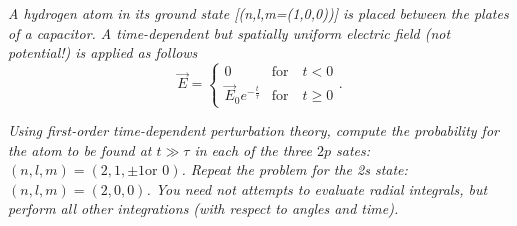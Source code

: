 \begin{example}
	\emph{A hydrogen atom in its ground state [(n,l,m=(1,0,0))] is placed between the plates of a capacitor. A time-dependent but spatially uniform electric field (not potential!) is applied as follows}
	\begin{equation}
		\vec{E}=\begin{cases} 0 &\mbox{for} \quad t<0 \\ 
			\vec{E}_0e^{-\frac{t}{\tau}} & \mbox{for} \quad t\geq 0  \end{cases}. 
	\end{equation} 
	
	\emph{Using first-order time-dependent perturbation theory, compute the probability for the atom to be found at $t\gg \tau$ in each of the three $2p$ sates: $(n,l,m)=(2,1,\pm1 \mbox{or } 0)$. Repeat the problem for the 2s state: $(n,l,m)=(2,0,0)$. You need not attempts to evaluate radial integrals, but perform all other integrations (with respect to angles and time).}\newline
	

\end{example}
